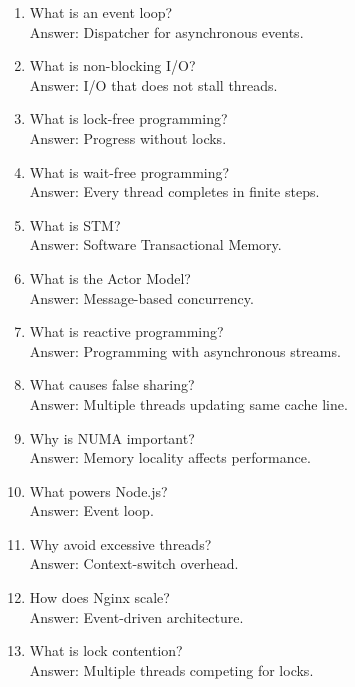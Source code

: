 \begin{enumerate}
\item What is an event loop?\\
Answer: Dispatcher for asynchronous events.

\item What is non-blocking I/O?\\
Answer: I/O that does not stall threads.

\item What is lock-free programming?\\
Answer: Progress without locks.

\item What is wait-free programming?\\
Answer: Every thread completes in finite steps.

\item What is STM?\\
Answer: Software Transactional Memory.

\item What is the Actor Model?\\
Answer: Message-based concurrency.

\item What is reactive programming?\\
Answer: Programming with asynchronous streams.

\item What causes false sharing?\\
Answer: Multiple threads updating same cache line.

\item Why is NUMA important?\\
Answer: Memory locality affects performance.

\item What powers Node.js?\\
Answer: Event loop.

\item Why avoid excessive threads?\\
Answer: Context-switch overhead.

\item How does Nginx scale?\\
Answer: Event-driven architecture.

\item What is lock contention?\\
Answer: Multiple threads competing for locks.
\end{enumerate}

